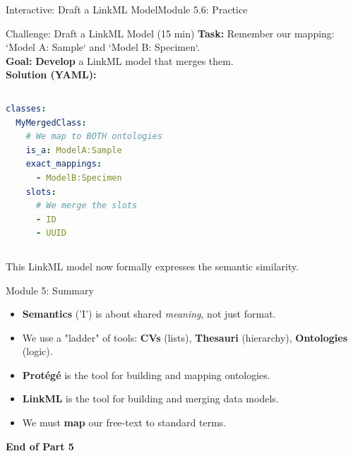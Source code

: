 \begin{frame}[fragile]{Interactive: Draft a LinkML Model}{Module 5.6: Practice}
    \begin{block}{Challenge: Draft a LinkML Model (15 min)}
        \textbf{Task:} Remember our mapping: `Model A: Sample` and `Model B: Specimen`. \\
        \pause
        \textbf{Goal:} \textbf{Develop} a LinkML model that merges them. \\
        \pause
        \textbf{Solution (YAML):}
        \begin{columns}
\begin{lstlisting}[language=yaml]
classes:
  MyMergedClass:
    # We map to BOTH ontologies
    is_a: ModelA:Sample
    exact_mappings:
      - ModelB:Specimen
    slots:
      # We merge the slots
      - ID
      - UUID
\end{lstlisting}

        \end{columns}
        \pause
        This LinkML model now formally expresses the semantic similarity.
    \end{block}
\end{frame}

\begin{frame}{Module 5: Summary}
    \begin{itemize}
        \item \textbf{Semantics} ('I') is about shared \emph{meaning}, not just format.
        \item We use a "ladder" of tools: \textbf{CVs} (lists), \textbf{Thesauri} (hierarchy), \textbf{Ontologies} (logic).
        \item \textbf{Protégé} is the tool for building and mapping ontologies.
        \item \textbf{LinkML} is the tool for building and merging data models.
        \item We must \textbf{map} our free-text to standard terms.
    \end{itemize}
    \vfill
    \begin{center}
        \textbf{End of Part 5}
    \end{center}
\end{frame}